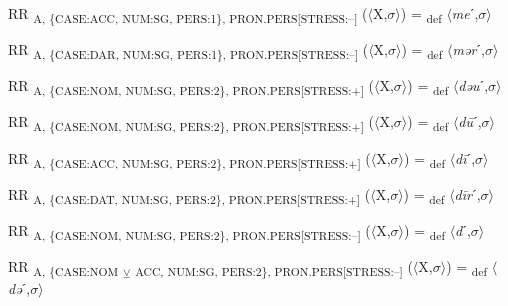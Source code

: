 {\begin{exe}
 RR \textsubscript{A, \{CASE:ACC, NUM:SG, PERS:1\}, PRON.PERS[STRESS:–]} ($\langle$X,$\sigma $$\rangle$) = \textsubscript{def} $\langle$\textit{me}ˊ,$\sigma $$\rangle$
\end{exe}

\begin{exe}
 RR \textsubscript{A, \{CASE:DAR, NUM:SG, PERS:1\}, PRON.PERS[STRESS:–]} ($\langle$X,$\sigma $$\rangle$) = \textsubscript{def} $\langle$\textit{mər}ˊ,$\sigma $$\rangle$
\end{exe}

\begin{exe}
 RR \textsubscript{A, \{CASE:NOM, NUM:SG, PERS:2\}, PRON.PERS[STRESS:+]} ($\langle$X,$\sigma $$\rangle$) = \textsubscript{def} $\langle$\textit{dəu}ˊ,$\sigma $$\rangle$
\end{exe}

\begin{exe}
 RR \textsubscript{A, \{CASE:NOM, NUM:SG, PERS:2\}, PRON.PERS[STRESS:+]} ($\langle$X,$\sigma $$\rangle$) = \textsubscript{def} $\langle$\textit{d\=u}ˊ,$\sigma $$\rangle$
\end{exe}

\begin{exe}
 RR \textsubscript{A, \{CASE:ACC, NUM:SG, PERS:2\}, PRON.PERS[STRESS:+]} ($\langle$X,$\sigma $$\rangle$) = \textsubscript{def} $\langle$\textit{d\=i}ˊ,$\sigma $$\rangle$
\end{exe}

\begin{exe}
 RR \textsubscript{A, \{CASE:DAT, NUM:SG, PERS:2\}, PRON.PERS[STRESS:+]} ($\langle$X,$\sigma $$\rangle$) = \textsubscript{def} $\langle$\textit{d\=ir}ˊ,$\sigma $$\rangle$
\end{exe}

\begin{exe}
 RR \textsubscript{A, \{CASE:NOM, NUM:SG, PERS:2\}, PRON.PERS[STRESS:–]} ($\langle$X,$\sigma $$\rangle$) = \textsubscript{def} $\langle$\textit{d}ˊ,$\sigma $$\rangle$
\end{exe}

\begin{exe}
 RR \textsubscript{A, \{CASE:NOM} \textsubscript{${\veebar}$}\textsubscript{ ACC, NUM:SG, PERS:2\}, PRON.PERS[STRESS:–]} ($\langle$X,$\sigma $$\rangle$) = \textsubscript{def} $\langle$\textit{də}ˊ,$\sigma $$\rangle$
\end{exe}

}
